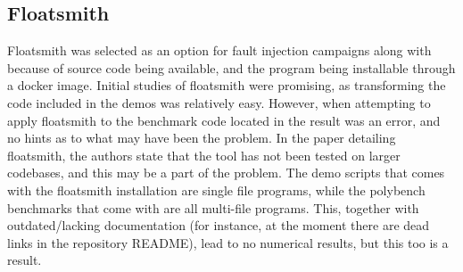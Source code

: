 \subsection{Floatsmith}

Floatsmith was selected as an option for fault injection campaigns along with \taffo{} because of source code being available, and the program being installable through a docker image. Initial studies of floatsmith were promising, as transforming the code included in the demos was relatively easy. 
However, when attempting to apply floatsmith to the benchmark code located in \taffo{} the result was an error, and no hints as to what may have been the problem. In the paper detailing floatsmith, the authors state that the tool has not been tested on larger codebases, and this may be a part of the problem. The demo scripts that comes with the floatsmith installation are single file programs, while the polybench benchmarks that come with \taffo{} are all multi-file programs. This, together with outdated/lacking documentation (for instance, at the moment there are dead links in the repository README), lead to no numerical results, but this too is a result.


